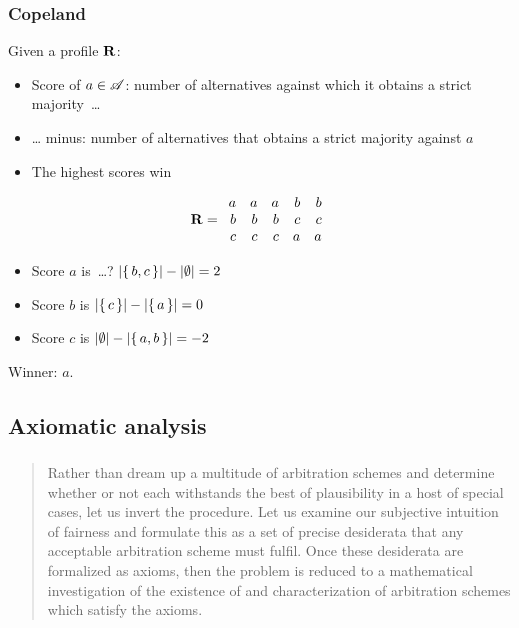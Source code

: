 \documentclass[french,english]{beamer}
\begin{document}
\begin{frame}
	\frametitle{Copeland}
	Given a profile $\mathbf{R}$:
	\begin{itemize}
		\item Score of $a \in \mathscr{A}$: number of alternatives against which it obtains a strict majority~…
		\item … minus: number of alternatives that obtains a strict majority against $a$
		\item The highest scores win
	\end{itemize}
	
	
	\begin{equation}
		\mathbf{R} =
		\begin{array}{rrrrr}
			a	&	a	&	a	&	b	&	b\\
			b	&	b	&	b	&	c	&	c\\
			c	&	c	&	c	&	a	&	a
		\end{array}
	\end{equation}
	\begin{itemize}
		\item Score $a$ is~\dots? \pause $\lvert{\set{b, c}}\rvert - \lvert{\emptyset}\rvert = 2$
		\item Score $b$ is $\lvert{\set{c}}\rvert - \lvert{\set{a}}\rvert = 0$
		\item Score $c$ is $\lvert{\emptyset}\rvert - \lvert{\set{a, b}}\rvert = -2$
	\end{itemize}
	Winner: $a$.
\end{frame}
	
\subsection{Axiomatic analysis}
\begin{frame}
	\frametitle{\subsecname}
	\begin{quote}
		Rather than dream up a multitude of arbitration schemes and determine whether or not each withstands the best of plausibility in a host of special cases, let us invert the procedure. Let us examine our subjective intuition of fairness and formulate this as a set of precise desiderata that any acceptable arbitration scheme must fulfil. Once these desiderata are formalized as axioms, then the problem is reduced to a mathematical investigation of the existence of and characterization of arbitration schemes which satisfy the axioms.
	\end{quote}
	\citet[p. 121]{luce_games_1957}\par
\end{frame}
\end{document}
